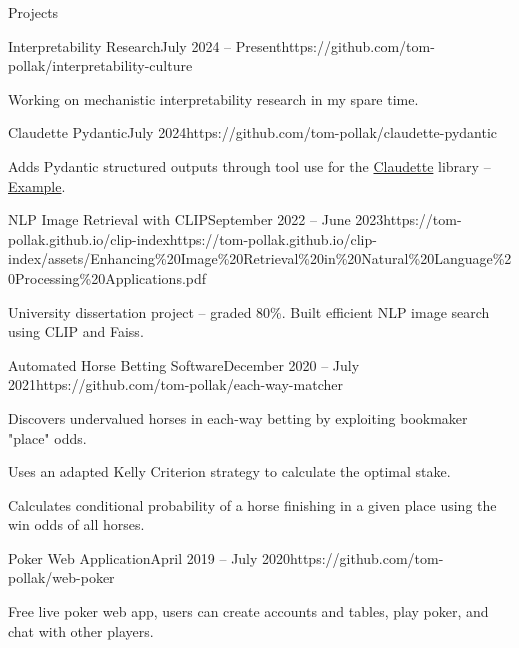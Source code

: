 \documentclass{structure}
\begin{document}
\begin{rSection}{Projects}

    \begin{rSubsection}{Interpretability Research}{July 2024 -- Present}{}{}{https://github.com/tom-pollak/interpretability-culture}{}
        \item Working on mechanistic interpretability research in my spare time.
    \end{rSubsection}

    \begin{rSubsection}{Claudette Pydantic}{July 2024}{}{}{https://github.com/tom-pollak/claudette-pydantic}{}
        \item Adds Pydantic structured outputs through tool use for the \href{https://github.com/AnswerDotAI/claudette}{Claudette} library -- {\color{blue}\href{https://nbviewer.org/github/tom-pollak/claudette-pydantic/blob/main/nbs/examples/pet_store.ipynb}{Example}}.
    \end{rSubsection}

    \begin{rSubsection}{NLP Image Retrieval with CLIP}{September 2022 -- June 2023}{}{}{https://tom-pollak.github.io/clip-index}{https://tom-pollak.github.io/clip-index/assets/Enhancing\%20Image\%20Retrieval\%20in\%20Natural\%20Language\%20Processing\%20Applications.pdf}
        \item University dissertation project -- graded 80\%. Built efficient NLP image search using CLIP and Faiss.
    \end{rSubsection}

    \begin{rSubsection}{Automated Horse Betting Software}{December 2020 -- July 2021}{}{}{https://github.com/tom-pollak/each-way-matcher}{}
        \item Discovers undervalued horses in each-way betting by exploiting bookmaker "place" odds.
        \item Uses an adapted Kelly Criterion strategy to calculate the optimal stake.
        \item Calculates conditional probability of a horse finishing in a given place using the win odds of all horses.
    \end{rSubsection}

    \begin{rSubsection}{Poker Web Application}{April 2019 -- July 2020}{}{}{https://github.com/tom-pollak/web-poker}{}
        \item Free live poker web app, users can create accounts and tables, play poker, and chat with other players.
    \end{rSubsection}

\end{rSection}
\end{document}
